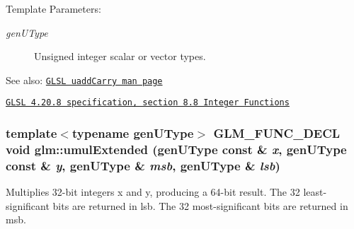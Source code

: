 \begin{Desc}
\item[Template Parameters:]
\begin{description}
\item[{\em genUType}]Unsigned integer scalar or vector types.\end{description}
\end{Desc}
\begin{Desc}
\item[See also:]\href{http://www.opengl.org/sdk/docs/manglsl/xhtml/uaddCarry.xml}{\tt GLSL uaddCarry man page} 

\href{http://www.opengl.org/registry/doc/GLSLangSpec.4.20.8.pdf}{\tt GLSL 4.20.8 specification, section 8.8 Integer Functions} \end{Desc}
\hypertarget{group__core__func__integer_g74e6492619a6a79d3130b56f7b6eb6a8}{
\subsubsection[umulExtended]{\setlength{\rightskip}{0pt plus 5cm}template$<$typename genUType$>$ GLM\_\-FUNC\_\-DECL void glm::umulExtended (genUType const \& {\em x}, \/  genUType const \& {\em y}, \/  genUType \& {\em msb}, \/  genUType \& {\em lsb})}}
\label{group__core__func__integer_g74e6492619a6a79d3130b56f7b6eb6a8}


Multiplies 32-bit integers x and y, producing a 64-bit result. The 32 least-significant bits are returned in lsb. The 32 most-significant bits are returned in msb.

